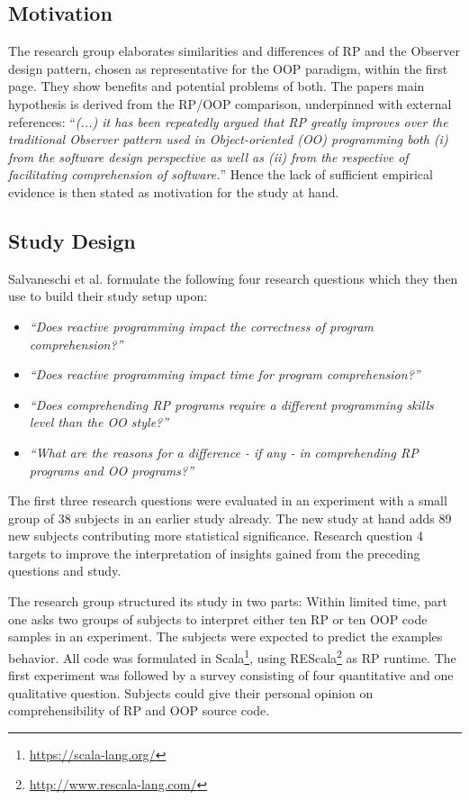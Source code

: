 \documentclass[12pt,a4paper]{article}
\begin{document}
\subsection{Motivation}
The research group elaborates similarities and differences of RP and the Observer design pattern, chosen as representative for the OOP paradigm, within the first page. They show benefits and potential problems of both. The papers main hypothesis is derived from the RP/OOP comparison, underpinned with external references: ``\emph{(...) it has been repeatedly argued that RP greatly improves over the traditional Observer pattern used in Object-oriented (OO) programming both (i) from the software design perspective as well as (ii) from the respective of facilitating comprehension of software.}'' \cite{7827078} Hence the lack of sufficient empirical evidence is then stated as motivation for the study at hand.

\subsection{Study Design}
Salvaneschi et al. \cite{7827078} formulate the following four research questions which they then use to build their study setup upon:

\begin{itemize}
	\item \emph{``Does reactive programming impact the correctness of program comprehension?''}
	\item \emph{``Does reactive programming impact time for program comprehension?''}
	\item \emph{``Does comprehending RP programs require a different programming skills level than the OO style?''}
	\item \emph{``What are the reasons for a difference - if any - in comprehending RP programs and OO programs?''}
\end{itemize}

The first three research questions were evaluated in an experiment with a small group of 38 subjects in an earlier study \cite{Salvaneschi:2014:ESP:2635868.2635895} already. The new study at hand adds 89 new subjects contributing more statistical significance. Research question 4 targets to improve the interpretation of insights gained from the preceding questions and study.

The research group structured its study in two parts: Within limited time, part one asks two groups of subjects to interpret either ten RP or ten OOP code samples in an experiment. The subjects were expected to predict the examples behavior. All code was formulated in Scala\footnote{\url{https://scala-lang.org/}}, using REScala\footnote{\url{http://www.rescala-lang.com/}} as RP runtime. The first experiment was followed by a survey consisting of four quantitative and one qualitative question. Subjects could give their personal opinion on comprehensibility of RP and OOP source code.
\end{document}
